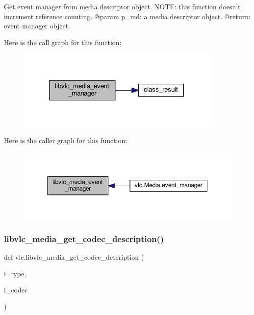 \begin{DoxyVerb}Get event manager from media descriptor object.
NOTE: this function doesn't increment reference counting.
@param p_md: a media descriptor object.
@return: event manager object.
\end{DoxyVerb}
 Here is the call graph for this function\+:
\nopagebreak
\begin{figure}[H]
\begin{center}
\leavevmode
\includegraphics[width=285pt]{namespacevlc_a2b3476422efeca7d595d8371533eaa58_cgraph}
\end{center}
\end{figure}
Here is the caller graph for this function\+:
\nopagebreak
\begin{figure}[H]
\begin{center}
\leavevmode
\includegraphics[width=344pt]{namespacevlc_a2b3476422efeca7d595d8371533eaa58_icgraph}
\end{center}
\end{figure}
\mbox{\label{namespacevlc_a9f7b1ab0dd2f4efbdd9f1d9fd8cf5fc9}} 
\subsubsection{\texorpdfstring{libvlc\+\_\+media\+\_\+get\+\_\+codec\+\_\+description()}{libvlc\_media\_get\_codec\_description()}}
{\footnotesize\ttfamily def vlc.\+libvlc\+\_\+media\+\_\+get\+\_\+codec\+\_\+description (\begin{DoxyParamCaption}\item[{}]{i\+\_\+type,  }\item[{}]{i\+\_\+codec }\end{DoxyParamCaption})}

